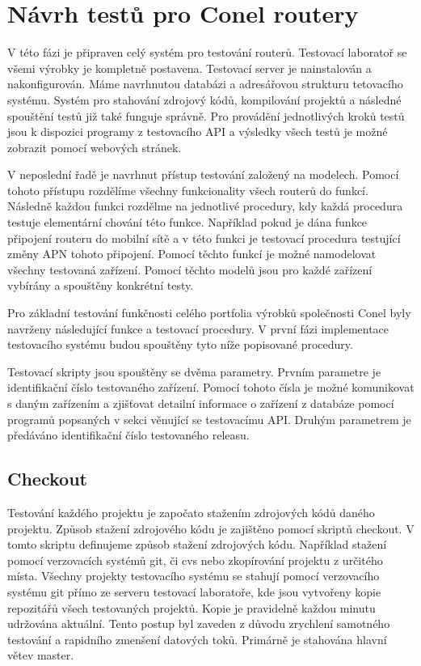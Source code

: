 \chapter{Návrh testů pro Conel routery}
V této fázi je připraven celý systém pro testování routerů. Testovací laboratoř se všemi výrobky je kompletně postavena. Testovací server je nainstalován a nakonfigurován. Máme navrhnutou databázi a adresářovou strukturu tetovacího systému. Systém pro stahování zdrojový kódů, kompilování projektů a následné spouštění testů již také funguje správně. Pro provádění jednotlivých kroků testů jsou k dispozici programy z testovacího API a výsledky všech testů je možné zobrazit pomocí webových stránek.

V neposlední řadě je navrhnut přístup testování založený na modelech. Pomocí tohoto přístupu rozdělíme všechny funkcionality všech routerů do funkcí. Následně každou funkci rozdělme na jednotlivé procedury, kdy každá procedura testuje elementární chování této funkce. Například pokud je dána funkce připojení routeru do mobilní sítě a v této funkci je testovací procedura testující změny APN tohoto připojení. Pomocí těchto funkcí je možné namodelovat všechny testovaná zařízení. Pomocí těchto modelů jsou pro každé zařízení vybírány a spouštěny konkrétní testy.

Pro základní testování funkčnosti celého portfolia výrobků společnosti Conel byly navrženy následující funkce a testovací procedury. V první fázi implementace testovacího systému budou spouštěny tyto níže popisované procedury.

Testovací skripty jsou spouštěny se dvěma parametry. Prvním parametre je identifikační číslo testovaného zařízení. Pomocí tohoto čísla je možné komunikovat s daným zařízením a zjišťovat detailní informace o zařízení z databáze pomocí programů popsaných v sekci věnující se testovacímu API. Druhým parametrem je předáváno identifikační číslo testovaného releasu.

\section{Checkout}
Testování každého projektu je započato stažením zdrojových kódů daného projektu. Způsob stažení zdrojového kódu je zajištěno pomocí skriptů checkout. V tomto skriptu definujeme způsob stažení zdrojových kódu. Například stažení pomocí verzovacích systémů git, či cvs nebo zkopírování projektu z určitého místa. Všechny projekty testovacího systému se stahují pomocí verzovacího systému git přímo ze serveru testovací laboratoře, kde jsou vytvořeny kopie repozitářů všech testovaných projektů. Kopie je pravidelně každou minutu udržována aktuální. Tento postup byl zaveden z důvodu zrychlení samotného testování a rapidního zmenšení datových toků. Primárně je stahována hlavní větev master.

